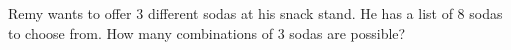 Remy wants to offer $3$ different sodas at his snack stand. He has a list of $8$ sodas to choose from. How many combinations of $3$ sodas are possible?
